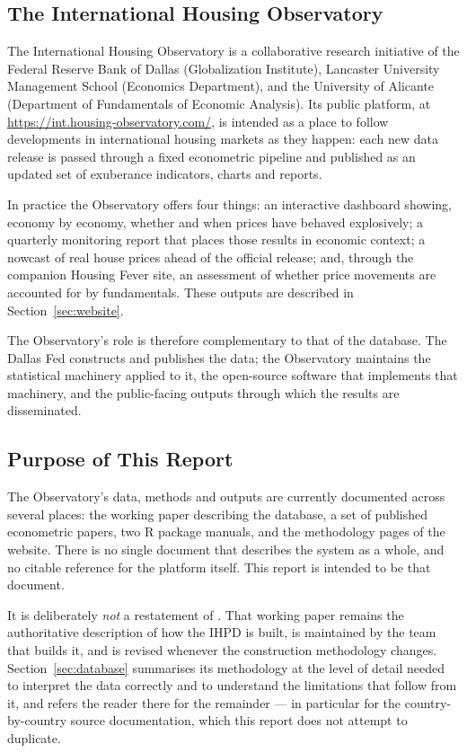\subsection{The International Housing Observatory}

The International Housing Observatory is a collaborative research initiative
of the Federal Reserve Bank of Dallas (Globalization Institute), Lancaster
University Management School (Economics Department), and the University of
Alicante (Department of Fundamentals of Economic Analysis). Its public
platform, at \url{https://int.housing-observatory.com/}, is intended as a
place to follow developments in international housing markets as they
happen: each new data release is passed through a fixed econometric pipeline
and published as an updated set of exuberance indicators, charts and reports.

In practice the Observatory offers four things: an interactive dashboard
showing, economy by economy, whether and when prices have behaved
explosively; a quarterly monitoring report that places those results in
economic context; a nowcast of real house prices ahead of the official
release; and, through the companion Housing Fever site, an assessment of
whether price movements are accounted for by fundamentals. These outputs are
described in Section~\ref{sec:website}.

The Observatory's role is therefore complementary to that of the database.
The Dallas Fed constructs and publishes the data; the Observatory maintains
the statistical machinery applied to it, the open-source software that
implements that machinery, and the public-facing outputs through which the
results are disseminated.

\subsection{Purpose of This Report}

The Observatory's data, methods and outputs are currently documented across
several places: the working paper describing the database, a set of published
econometric papers, two \textsf{R} package manuals, and the methodology pages
of the website. There is no single document that describes the system as a
whole, and no citable reference for the platform itself. This report is
intended to be that document.

It is deliberately \emph{not} a restatement of
\citet{mack2011}. That working paper remains the authoritative description of
how the IHPD is built, is maintained by the team that builds it, and is
revised whenever the construction methodology changes. Section~\ref{sec:database}
summarises its methodology at the level of detail needed to interpret the
data correctly and to understand the limitations that follow from it, and
refers the reader there for the remainder --- in particular for the
country-by-country source documentation, which this report does not attempt
to duplicate.


